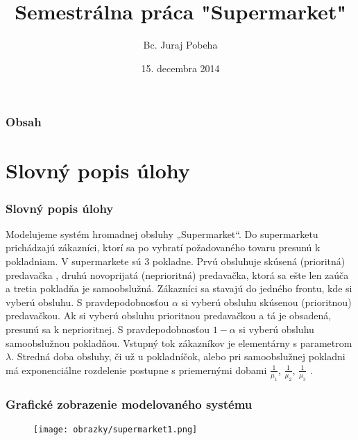 \documentclass[hyperref={pdfpagelabels=false}]{beamer}
\title[Teória hromadnej obsluhy]{Semestrálna práca "Supermarket"}
\author[Bc. Juraj Pobeha]{Bc. Juraj Pobeha}
\institute []
{  
  Žilinská Univerzita v Žiline\\
  Fakulta riadenia a informatiky
}
\date{15. decembra 2014}
\begin{document}

\begin{frame}
\titlepage
\end{frame} 


\begin{frame}
\frametitle{Obsah}
\tableofcontents
\end{frame} 


\section{Slovný popis úlohy} 
\begin{frame}
\frametitle{Slovný popis úlohy}
Modelujeme systém hromadnej obsluhy „Supermarket“. Do supermarketu prichádzajú zákazníci, ktorí sa po vybratí požadovaného tovaru presunú k pokladniam. V supermarkete sú 3 pokladne. Prvú obsluhuje skúsená (prioritná) predavačka , druhú novoprijatá (neprioritná) predavačka, ktorá sa ešte len zaúča a tretia pokladňa je samoobslužná. Zákazníci sa stavajú do jedného frontu, kde si vyberú obsluhu. S pravdepodobnosťou $\alpha$ si vyberú obsluhu skúsenou (prioritnou) predavačkou. Ak si vyberú obsluhu prioritnou predavačkou a tá je obsadená, presunú sa k neprioritnej. S pravdepodobnosťou $1-\alpha$ si vyberú obsluhu samoobslužnou pokladňou. Vstupný tok zákazníkov je elementárny s parametrom $\lambda$. Stredná doba obsluhy, či už u pokladníčok, alebo pri samoobslužnej pokladni má exponenciálne rozdelenie postupne s priemernými dobami $\frac{1}{\mu_1}$, $\frac{1}{\mu_2}$, $\frac{1}{\mu_3}$ .
\end{frame}

\begin{frame}
\frametitle{Grafické zobrazenie modelovaného systému}
\begin{figure}[!hlrbt]
\begin{center}
\texttt{[image: obrazky/supermarket1.png]}
\end{center}
\end{figure}
\end{frame}
\end{document}
